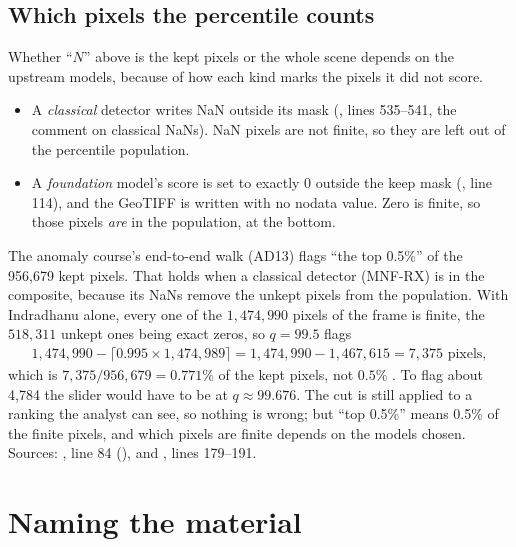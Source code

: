 \subsection{Which pixels the percentile counts}

Whether ``$N$'' above is the kept pixels or the whole scene depends on the upstream models, because of how
each kind marks the pixels it did not score.
\begin{itemize}
\item A \emph{classical} detector writes NaN outside its mask (, lines
  535--541, the comment on classical NaNs). NaN pixels are not finite, so they are left out of the percentile
  population.
\item A \emph{foundation} model's score is set to exactly $0$ outside the keep mask
  (, line 114), and the GeoTIFF is written with no nodata value.
  Zero is finite, so those pixels \emph{are} in the population, at the bottom.
\end{itemize}

\begin{sourcenote}
The anomaly course's end-to-end walk (AD13) flags ``the top 0.5\%'' of the 956,679 kept pixels. That holds
when a classical detector (MNF-RX) is in the composite, because its NaNs remove the unkept pixels from the
population. With Indradhanu alone, every one of the $1{,}474{,}990$ pixels of the frame is finite, the
$518{,}311$ unkept ones being exact zeros, so $q=99.5$ flags
\begin{align*}
1{,}474{,}990-\lceil0.995\times1{,}474{,}989\rceil = 1{,}474{,}990-1{,}467{,}615 = 7{,}375 \text{ pixels},
\end{align*}
which is $7{,}375/956{,}679=0.771\%$ of the kept pixels, not $0.5\%$ \tagC. To flag about 4,784 the slider would
have to be at $q\approx99.676$. The cut is still applied to a ranking the analyst can see, so nothing is
wrong; but ``top 0.5\%'' means 0.5\% of the finite pixels, and which pixels are finite depends on the models
chosen. Sources: , line 84 (), and
, lines 179--191.
\end{sourcenote}

\section{Naming the material}\label{sec:material:naming}

